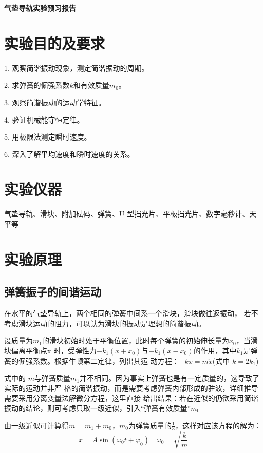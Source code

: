 \documentclass[11pt,a4paper]{article}
\newcommand*{\song}{\CJKfamily{zhsong}}
\begin{document}
\noindent

\begin{center}

    \textbf{\song {} 气垫导轨实验预习报告}
    
\end{center}




\section{实验目的及要求}
1. 观察简谐振动现象，测定简谐振动的周期。

2. 求弹簧的倔强系数$k$和有效质量$m_0$。

3. 观察简谐振动的运动学特征。

4. 验证机械能守恒定律。

5. 用极限法测定瞬时速度。

6. 深入了解平均速度和瞬时速度的关系。

\section{实验仪器}
    气垫导轨、滑块、附加砝码、弹簧、U 型挡光片、平板挡光片、数字毫秒计、天平等
\section{实验原理}
\subsection{弹簧振子的间谐运动}
在水平的气垫导轨上，两个相同的弹簧中间系一个滑块，滑块做往返振动，
若不考虑滑块运动的阻力，可以认为滑块的振动是理想的简谐振动。

设质量为$m_1$的滑块初始时处于平衡位置，此时每个弹簧的初始伸长量为$x_0$，当滑块偏离平衡点x
时，受弹性力$-k_1(x+x_0)$与$-k_1(x-x_0)$的作用，其中$k_1$是弹簧的倔强系数。根据牛顿第二定律，列出其运
动方程：$ - kx = m\ddot x$(式中 $k = 2 k_1$)

式中的 $𝑚$与弹簧质量$m_1$并不相同。因为事实上弹簧也是有一定质量的，这导致了实际的运动并非严
格的简谐振动，而是需要考虑弹簧内部形成的驻波，详细推导需要采用分离变量法解微分方程，这里直接
给出结果：若在近似的仍欲采用简谐振动的结论，则可考虑只取一级近似，引入“弹簧有效质量”$m_0$

由一级近似可计算得$m = m_1 + m_0$，$m_0$为弹簧质量的$\frac{1}{3}$，这样对应该方程的解为：
\begin{equation}
    x = A\sin ({\omega _0}t + {\varphi _0})\quad {\omega _0} = \sqrt {\frac{k}{m}} 
\end{equation}
\end{document}
